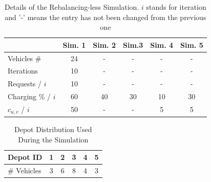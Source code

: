 \begin{table}[h]
		\centering
		\begin{tabular}{ |l| c|c|c|c|c|}
			\hline
			&Sim. 1 & Sim. 2& Sim.3&Sim. 4&Sim. 5 \\
			\hline
			Vehicles \#& 24&-&- &-&-\\
			Iterations & 10&-&-&-&-\\
			Requests / $i$ & 10&-&-&-&-\\
			Charging \% / $i$ & 60&40&30&10&30\\
			$c_{u,v}$  / $i$ & 50&-&-&5&5\\
		\end{tabular}
		\caption[Details of the Rebalancing-less Simulation]{Details of the Rebalancing-less Simulation. $i$ stands for iteration and '-' means the entry has not been changed from the previous one}
		\label{tab:routingless_simu_details}   
\end{table} 
	\begin{table}[h]
	\centering
	\begin{tabular}{ | p{2cm} | c | c | c | c |c|}
		\hline
		Depot ID & 1 & 2 & 3 & 4 & 5\\
		\hline
		\# Vehicles & 3 & 6 & 8 & 4 & 3\\
	\end{tabular}
	\caption{Depot Distribution Used During the Simulation}
	\label{tab:routingless_depot_distribution}   
\end{table}



